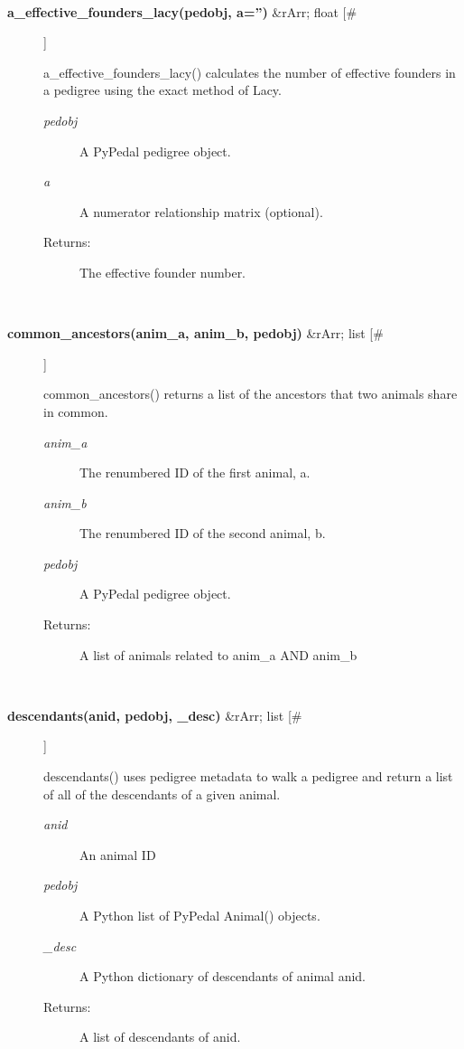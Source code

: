 \begin{description}
\begin{description}
\end{description}
\\ 

\item[\textbf{a\_effective\_founders\_lacy(pedobj, a='')}
 \&rArr; float [\#]]

 a\_effective\_founders\_lacy() calculates the number of effective founders in a pedigree using the exact method of Lacy.
\begin{description}
\item[\emph{pedobj}
] A PyPedal pedigree object.
\item[\emph{a}
] A numerator relationship matrix (optional).
\item[Returns:] The effective founder number.

\end{description}
\\ 

\item[\textbf{common\_ancestors(anim\_a, anim\_b, pedobj)}
 \&rArr; list [\#]]

 common\_ancestors() returns a list of the ancestors that two animals share in common.
\begin{description}
\item[\emph{anim\_a}
] The renumbered ID of the first animal, a.
\item[\emph{anim\_b}
] The renumbered ID of the second animal, b.
\item[\emph{pedobj}
] A PyPedal pedigree object.
\item[Returns:] A list of animals related to anim\_a AND anim\_b

\end{description}
\\ 

\item[\textbf{descendants(anid, pedobj, \_desc)}
 \&rArr; list [\#]]

 descendants() uses pedigree metadata to walk a pedigree and return a list of all of the descendants of a given animal.
\begin{description}
\item[\emph{anid}
] An animal ID
\item[\emph{pedobj}
] A Python list of PyPedal Animal() objects.
\item[\emph{\_desc}
] A Python dictionary of descendants of animal anid.
\item[Returns:] A list of descendants of anid.

\end{description}
\\ 


\end{description}
